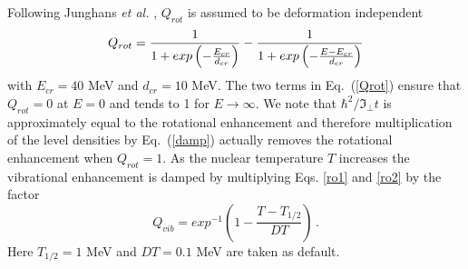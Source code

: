 \noindent Following Junghans \emph{et al.} \cite{Ignadamp}, $Q_{rot}$ is
assumed to be deformation independent
\begin{equation}
Q_{rot}=\frac{1}{1+exp\left(-\frac{E_{cr}}{d_{cr}}\right)}-\frac{1}{%
1+exp\left(-\frac{E-E_{cr}}{d_{cr}}\right)}  \label{Qrot}
\end{equation}
\noindent with $E_{cr}=40$ MeV and $d_{cr}=10$ MeV. The two terms in
Eq.~(\ref{Qrot}) ensure that $Q_{rot}=0$ at $E=0$ and tends to 1 for $%
E\rightarrow\infty$. We note that $\hbar^{2}/\Im_{\bot}t$ is approximately
equal to the rotational enhancement and therefore multiplication of the
level densities%
 by Eq.~(\ref{damp}) actually removes the rotational
enhancement when $Q_{rot}=1$. As the nuclear temperature $T$ increases the
vibrational enhancement is damped by multiplying Eqs. \ref{ro1} and \ref{ro2}
by the factor
\begin{equation}
Q_{vib}=exp^{-1}\left(1-%
\frac{T-T_{1/2}}{DT}\right)\,.  \label{Qvib}
\end{equation}
Here $T_{1/2}=1$ MeV and $DT=0.1$ MeV are taken as default.

